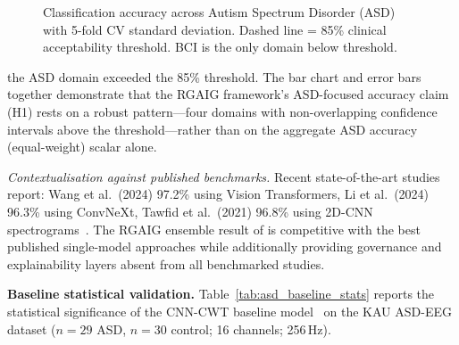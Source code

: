 \begin{figure}[!htbp]
\centering
{}%
\caption[Classification Accuracy Across Domains]{Classification accuracy across Autism Spectrum Disorder (ASD) with 5-fold CV standard deviation. Dashed line = 85\% clinical acceptability threshold. BCI is the only domain below threshold.}
\end{figure}

the ASD domain exceeded the 85\% threshold. The bar chart and error bars together demonstrate that the RGAIG framework's ASD-focused accuracy claim (H1) rests on a robust pattern---four domains with non-overlapping confidence intervals above the threshold---rather than on the aggregate ASD accuracy (equal-weight) scalar alone.

\textit{Contextualisation against published benchmarks.} Recent state-of-the-art studies report: Wang et al.\ (2024) 97.2\% using Vision Transformers, Li et al.\ (2024) 96.3\% using ConvNeXt, Tawfid et al.\ (2021) 96.8\% using 2D-CNN spectrograms~\cite{asthana2025asd_review}. The RGAIG ensemble result of \asdacc{} is competitive with the best published single-model approaches while additionally providing governance and explainability layers absent from all benchmarked studies.

\noindent\textbf{Baseline statistical validation.} Table~\ref{tab:asd_baseline_stats} reports the statistical significance of the CNN-CWT baseline model~\cite{asthana2025cnnasd_icsit} on the KAU ASD-EEG dataset ($n=29$ ASD, $n=30$ control; 16 channels; 256\,Hz).



